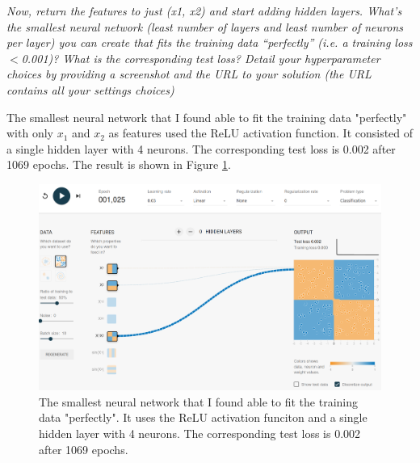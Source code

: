 \textit{Now, return the features to just (x1, x2) and start adding hidden layers. What’s the smallest neural network
(least number of layers and least number of neurons per layer) you can create that fits the training data
“perfectly” (i.e. a training loss $<$0.001)? What is the corresponding test loss? Detail your hyperparameter
choices by providing a screenshot and the URL to your solution (the URL contains all your settings choices)}

The smallest neural network that I found able to fit the training data "perfectly" with only $x_1$ and $x_2$ as features used the ReLU activation function. It consisted of a single hidden layer with 4 neurons. The corresponding test loss is 0.002 after  1069 epochs. The result is shown in Figure \ref{fig:x1_x2_perfect}.

\begin{figure}[htbp]
    \centering
    \includegraphics[width = 0.9\linewidth]{img/x1_x2_x1x2_feat.png}
    \caption{The smallest neural network that I found able to fit the training data "perfectly". It uses the ReLU activation funciton and a single hidden layer with 4 neurons. The corresponding test loss is 0.002 after  1069 epochs.}
    \label{fig:x1_x2_perfect}
\end{figure}




























